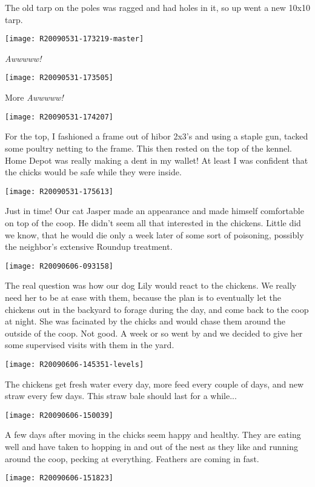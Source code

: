 The old tarp on the poles was ragged and had holes in it, so up went a
new 10x10 tarp. 
\newpage

\texttt{[image: R20090531-173219-master]}

{\em Awwwww!}
\newpage

\texttt{[image: R20090531-173505]}

More {\em Awwwww!}
\newpage

\texttt{[image: R20090531-174207]}

For the top, I fashioned a frame out of hibor 2x3's and using a staple
gun, tacked some poultry netting to the frame.  This then rested on the
top of the kennel.  Home Depot was really making a dent in my wallet!
At least I was confident that the chicks would be safe while they were
inside. 
\newpage

\texttt{[image: R20090531-175613]}

Just in time!  Our cat Jasper made an appearance and made himself
comfortable on top of the coop.  He didn't seem all that interested in
the chickens.  Little did we know, that he would die only a week later
of some sort of poisoning, possibly the neighbor's extensive Roundup
treatment. 
\newpage

\texttt{[image: R20090606-093158]}

The real question was how our dog Lily would react to the chickens.  We
really need her to be at ease with them, because the plan is to
eventually let the chickens out in the backyard to forage during the
day, and come back to the coop at night.  She was facinated by the
chicks and would chase them around the outside of the coop.  Not good.
A week or so went by and we decided to give her some supervised visits
with them in the yard. 
\newpage

\texttt{[image: R20090606-145351-levels]}

The chickens get fresh water every day, more feed every couple of days,
and new straw every few days.  This straw bale should last for a
while... 
\newpage

\texttt{[image: R20090606-150039]}

A few days after moving in the chicks seem happy and healthy.  They are
eating well and have taken to hopping in and out of the nest as they
like and running around the coop, pecking at everything.  Feathers are
coming in fast. 
\newpage

\texttt{[image: R20090606-151823]}

